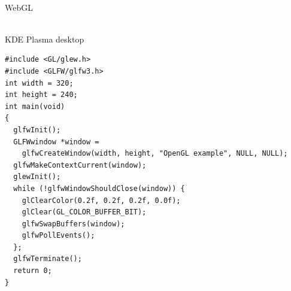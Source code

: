 \documentclass[calcdimensions,landscape,letterpaper]{powersem}
\newcommand{\thecurrentheading}{}
\newcommand{\heading}[1]{\renewcommand{\thecurrentheading}{#1}}
\begin{document}
\begin{slide}
\begin{center}
\begin{minipage}[c]{.47\textwidth}
\begin{center}
        \\
        WebGL
      \end{center}
    \end{minipage}
    \begin{minipage}[c]{.47\textwidth}
      \begin{center}
        \\
        KDE Plasma desktop
      \end{center}
    \end{minipage}
  \end{center}
\end{slide}

\begin{slide}
    \heading{GLFW Window}
    \begin{center}
        \begin{minipage}[c]{.98\textwidth}
            \begin{verbatim}
#include <GL/glew.h>
#include <GLFW/glfw3.h>
int width = 320;
int height = 240;
int main(void)
{
  glfwInit();
  GLFWwindow *window =
    glfwCreateWindow(width, height, "OpenGL example", NULL, NULL);
  glfwMakeContextCurrent(window);
  glewInit();
  while (!glfwWindowShouldClose(window)) {
    glClearColor(0.2f, 0.2f, 0.2f, 0.0f);
    glClear(GL_COLOR_BUFFER_BIT);
    glfwSwapBuffers(window);
    glfwPollEvents();
  };
  glfwTerminate();
  return 0;
}
            \end{verbatim}
        \end{minipage}
    \end{center}
\end{slide}
\end{document}
